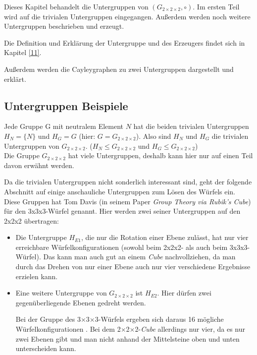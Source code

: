 \documentclass[12pt,a4paper, usenames, dvipsnames]{article}
\newcommand{\Gtwo}{\ensuremath{G_{2\times 2\times 2}}}
\newcommand{\Ttwo}{2$\times$2$\times$2-}
\newcommand{\Tthree}{3$\times$3$\times$3-}
\begin{document}
Dieses Kapitel behandelt die Untergruppen von $(\Gtwo, \circ)$. Im ersten Teil wird auf die trivialen Untergruppen eingegangen. Außerdem werden noch weitere Untergruppen beschrieben und erzeugt.

Die Definition und Erklärung der Untergruppe und des Erzeugers findet sich in Kapitel \ref{11}.

Außerdem werden die Cayleygraphen zu zwei Untergruppen dargestellt und erklärt.

%
%
%
%
%
%
%
%
%
%
%
%
%
%
%
%
%
%
%
%
\subsection*{Untergruppen Beispiele}



Jede Gruppe G mit neutralem Element $N$ hat die beiden trivialen Untergruppen ${H_N = \{N\}}$ und $H_G=G$ (hier: $G=\Gtwo$). Also sind $H_N$ und $H_G$ die trivialen Untergruppen von $\Gtwo$. ($H_N \leqslant \Gtwo$ und $H_G \leqslant \Gtwo$)\\
Die Gruppe $\Gtwo$ hat viele Untergruppen, deshalb kann hier nur auf einen Teil davon erwähnt werden. 


Da die trivialen Untergruppen nicht sonderlich interessant sind, geht der folgende Abschnitt auf einige anschauliche Untergruppen zum Lösen des Würfels ein. Diese Gruppen hat Tom Davis (in seinem Paper \textit{Group Theory via Rubik's Cube}) \cite{TD} für den 3x3x3-Würfel genannt. Hier werden zwei seiner Untergruppen auf den 2x2x2 übertragen: 
\begin{itemize}
\item Die Untergruppe $H_{E1}$, die nur die Rotation einer Ebene zulässt, hat nur vier erreichbare Würfelkonfigurationen (sowohl beim 2x2x2- als auch beim 3x3x3-Würfel). Das kann man auch gut an einem \textit{Cube} nachvollziehen, da man durch das Drehen von nur einer Ebene auch nur vier verschiedene Ergebnisse erzielen kann.
\item Eine weitere Untergruppe von $\Gtwo$ ist $H_{E2}$. Hier dürfen zwei gegenüberliegende Ebenen gedreht werden. 

Bei der Gruppe des \Tthree Würfels ergeben sich daraus 16 mögliche Würfelkonfigurationen \cite{TD}. Bei dem \Ttwo \textit{Cube} allerdings nur vier, da es nur zwei Ebenen gibt und man nicht anhand der Mittelsteine oben und unten unterscheiden kann.
\end{itemize}
\end{document}

